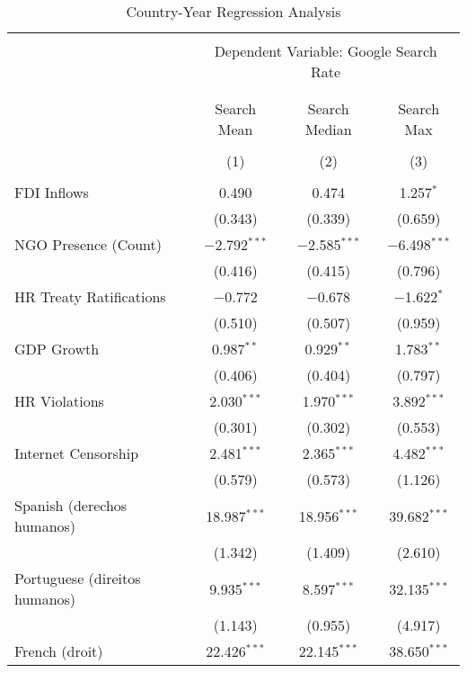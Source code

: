 
\begin{table}[!htbp] \centering 
  \caption{Country-Year Regression Analysis} 
  \label{} 
\begin{tabular}{@{\extracolsep{5pt}}lccc} 
\\[-1.8ex]\hline 
\hline \\[-1.8ex] 
 & \multicolumn{3}{c}{Dependent Variable: Google Search Rate} \\ 
\cline{2-4} 
\\[-1.8ex] & \multicolumn{3}{c}{ } \\ 
 & Search Mean & Search Median & Search Max \\ 
\\[-1.8ex] & (1) & (2) & (3)\\ 
\hline \\[-1.8ex] 
 FDI Inflows & 0.490 & 0.474 & 1.257$^{*}$ \\ 
  & (0.343) & (0.339) & (0.659) \\ 
  NGO Presence (Count) & $-$2.792$^{***}$ & $-$2.585$^{***}$ & $-$6.498$^{***}$ \\ 
  & (0.416) & (0.415) & (0.796) \\ 
  HR Treaty Ratifications & $-$0.772 & $-$0.678 & $-$1.622$^{*}$ \\ 
  & (0.510) & (0.507) & (0.959) \\ 
  GDP Growth & 0.987$^{**}$ & 0.929$^{**}$ & 1.783$^{**}$ \\ 
  & (0.406) & (0.404) & (0.797) \\ 
  HR Violations & 2.030$^{***}$ & 1.970$^{***}$ & 3.892$^{***}$ \\ 
  & (0.301) & (0.302) & (0.553) \\ 
  Internet Censorship & 2.481$^{***}$ & 2.365$^{***}$ & 4.482$^{***}$ \\ 
  & (0.579) & (0.573) & (1.126) \\ 
  Spanish (derechos humanos) & 18.987$^{***}$ & 18.956$^{***}$ & 39.682$^{***}$ \\ 
  & (1.342) & (1.409) & (2.610) \\ 
  Portuguese (direitos humanos) & 9.935$^{***}$ & 8.597$^{***}$ & 32.135$^{***}$ \\ 
  & (1.143) & (0.955) & (4.917) \\ 
  French (droit) & 22.426$^{***}$ & 22.145$^{***}$ & 38.650$^{***}$ \\ 

\end{tabular}
\end{table}
